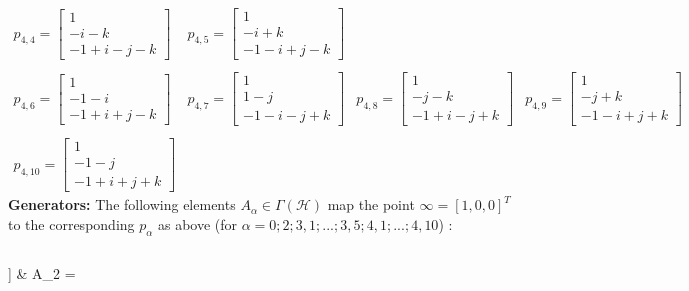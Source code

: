 \documentclass{article}[12pt]
\begin{document}
$$\begin{array}{cccccc}
  p_{4,4}=\left[ \begin{array}{c} 1 \\ -i-k \\ -1+i-j-k  \end{array}\right] &
  p_{4,5}=\left[ \begin{array}{c}  1 \\ -i+k \\ -1-i+j-k  \end{array}\right] \\
\\
  p_{4,6}=\left[ \begin{array}{c} 1 \\ -1-i \\ -1+i+j-k  \end{array}\right] &
   p_{4,7}=\left[ \begin{array}{c} 1 \\ 1-j \\ -1-i-j+k  \end{array}\right] &
    p_{4,8}=\left[ \begin{array}{c} 1 \\ -j-k \\ -1+i-j+k  \end{array}\right] &
     p_{4,9}=\left[ \begin{array}{c} 1 \\ -j+k \\ -1-i+j+k  \end{array}\right] \\
     \\
      p_{4,10}=\left[ \begin{array}{c} 1 \\ -1-j \\ -1+i+j+k  \end{array}\right] 
  \end{array}
$$
{\bf Generators:}  The following elements $A_\alpha \in \Gamma(\mathcal{H})$ map the point $\infty=[1,0,0]^T$ to the corresponding $p_\alpha$ as above (for $\alpha=0; 2; 3,1;...;3,5; 4,1;...; 4,10$) :


$$
\begin{array}{ccc} A_0=I_0= & 
  A_2 =  \\\\
\end{document}
